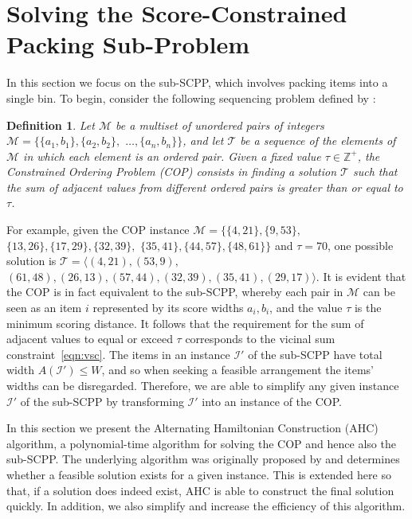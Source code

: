 \documentclass[a4paper,11pt,authoryear]{elsarticle}
\newcommand{\rev}[1]{{\color{myRed}#1}}
\newtheorem{definition}{Definition}
\begin{document}
\section{Solving the Score-Constrained Packing Sub-Problem}
\label{sec:ahc}

\noindent In this section we focus on the sub-SCPP, which involves packing items into a single bin. To begin, consider the following sequencing problem defined by \cite{hawa2018}:

\begin{definition}
	Let $\mathcal{M}$ be a multiset of unordered pairs of integers $\mathcal{M} = \{\{a_1, b_1\}, \{a_2, b_2\},$ $\dotsc,\{a_n, b_n\}\}$, and let $\mathcal{T}$ be a sequence of the elements of $\mathcal{M}$ \rev{in which each element is an ordered pair}. Given a fixed value $\tau \in \mathbb{Z}^+$, the \emph{Constrained Ordering Problem (COP)} \rev{consists in} finding a solution $\mathcal{T}$ such that the sum of adjacent values from different \rev{ordered pairs} is greater than or equal to $\tau$.
	\label{defn:cop}
\end{definition}

\noindent For example, given the COP instance $\mathcal{M} = \{\{4,21\}, \{9,53\},$ $\{13,26\}, \{17,29\}, \{32,39\},$ $\{35,41\}, \{44,57\}, \{48,61\} \}$ and $\tau = 70$, one possible solution is $\mathcal{T} = \langle(4,21), (53,9),$ $(61,48), (26,13), (57,44), (32,39), (35,41), (29,17)\rangle$. It is evident that the COP is in fact equivalent to the sub-SCPP, whereby each pair in $\mathcal{M}$ can be seen as an item $i$ represented by its score widths $a_i, b_i$, and the value $\tau$ is the minimum scoring distance. It follows that the requirement for the sum of adjacent values to equal or exceed $\tau$ corresponds to the vicinal sum constraint~\eqref{eqn:vsc}. \rev{The items in an instance $\mathcal{I}'$ of the sub-SCPP have total width $A(\mathcal{I}') \leq W$, and so when seeking a feasible arrangement the items' widths can be disregarded. Therefore, we are able to simplify any given instance $\mathcal{I}'$ of the sub-SCPP by transforming $\mathcal{I}'$ into an instance of the COP.}

In this section we present the Alternating Hamiltonian Construction (AHC) algorithm, a polynomial-time algorithm for solving the COP and hence also the sub-SCPP. The underlying algorithm was originally proposed by \cite{becker2010} and determines whether a feasible solution exists for a given instance. This is extended here so that, if a solution does indeed exist, AHC is able to construct the final solution quickly. In addition, we also simplify and increase the efficiency of this algorithm.
\end{document}
